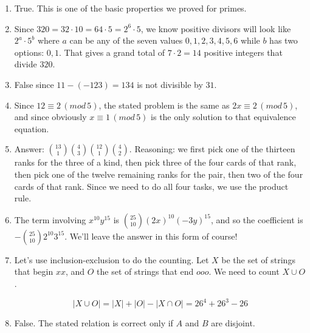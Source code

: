 \documentclass[11pt]{amsart}
\begin{document}
\begin{enumerate}

\item True. This is one of the basic properties we proved for primes.

\medskip

\item Since $320 = 32\cdot 10 = 64\cdot 5 = 2^6\cdot 5$, we know positive divisors will look
like $2^a\cdot5^b$ where $a$ can be any of the seven values $0,1,2,3,4,5,6$ while $b$ has two
options: $0,1$. That gives a grand total of $7\cdot2 = 14$ positive integers that divide $320$.

\medskip

\item False since $11-(-123) = 134$ is not divisible by $31$. 

\medskip

\item Since $12\equiv 2\,(mod\,5)$, the stated problem is the same as $2x\equiv 2\,(mod\,5)$,
and since obviously $x\equiv 1\,(mod\,5)$ is the only solution to that equivalence equation.

\medskip

\item Answer: $\displaystyle \binom{13}{1}\binom{4}{3}\binom{12}{1}\binom{4}{2}$. Reasoning: we first pick one
of the thirteen ranks for the three of a kind, then pick three of the four cards of that rank, then pick one of the twelve remaining ranks for the pair, then two of the four cards of that rank. Since we need to do all four tasks, we use the product rule. 


\medskip


\item The term involving $x^{10}y^{15}$ is $\displaystyle \binom{25}{10}(2x)^{10}(-3y)^{15}$, and so the
coefficient is $\displaystyle -\binom{25}{10}2^{10}3^{15}$. We'll leave the answer in this form of course!


\medskip

\item Let's use inclusion-exclusion to do the counting. Let $X$ be the set of strings that begin $xx$, 
and $O$ the set of strings that end $ooo$. We need to count $X\cup O$.

\[
|X\cup O| = |X| + |O| - |X\cap O| = 26^4 + 26^3 - 26
\]

\medskip

\item False. The stated relation is correct only if $A$ and $B$ are disjoint.


\end{enumerate}
\end{document}
